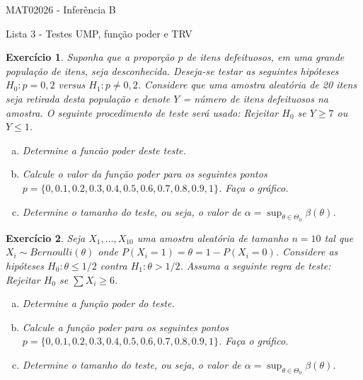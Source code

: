 \documentclass[letter,11pt]{article}
\newtheorem{exer}{Exercício}
\begin{document}
\begin{center}{ \Large MAT02026 - Inferência B }\end{center}

\begin{center}
{\large  \sc Lista 3 - Testes UMP, função poder e TRV}
\end{center}
\vspace{5mm}

\begin{exer} \rm
Suponha que a proporção $p$ de itens defeituosos, em uma grande população de itens,
seja desconhecida. Deseja-se testar as seguintes hipóteses $H_0 : p = 0,2$ versus
$H_1 : p \neq 0,2$. Considere que uma amostra aleatória de 20 itens seja retirada
desta população e denote $Y$ = número de itens defeituosos na amostra. O seguinte
procedimento de teste será usado: Rejeitar $H_0$ se $Y \geq 7$ ou $Y \leq 1$.
\begin{enumerate}[a)]
  \item Determine a funcão poder deste teste.
  \item Calcule o valor da função poder para os seguintes pontos
  $p = \{0, 0.1, 0.2, 0.3, 0.4, 0.5, 0.6, 0.7, 0.8, 0.9, 1\}$. Faça o gráfico.
  \item Determine o tamanho do teste, ou seja, o valor de $\alpha = \sup_{\theta
  \in\Theta_0} \beta(\theta)$.
\end{enumerate}
\end{exer}


\begin{exer} \rm
Seja $X_1, \ldots, X_{10} $ uma amostra aleatória de tamanho $n = 10$ tal que
$X_i \sim Bernoulli(\theta)$ onde $P(X_i = 1) = \theta = 1 - P(X_i = 0)$.
Considere as hipóteses $H_0 : \theta \leq 1/2$ contra $H_1 : \theta > 1/2$.
Assuma a seguinte regra de teste: Rejeitar $H_0$ se $\sum X_i \geq 6$.
\begin{enumerate}[a)]
  \item Determine a função poder do teste.
  \item Calcule a função poder para os seguintes pontos $p = \{0, 0.1, 0.2, 0.3, 0.4, 0.5, 0.6, 0.7, 0.8, 0.9, 1\}$. Faça o gráfico.
  \item Determine o tamanho do teste, ou seja, o valor de $\alpha = \sup_{\theta \in\Theta_0} \beta(\theta)$.
\end{enumerate}
\end{exer}
\end{document}
